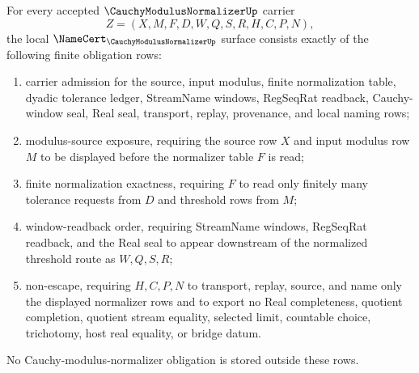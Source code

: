\begin{theorem}
\label{thm:cauchy-modulus-normalizer-namecert-obligations}
For every accepted $\CauchyModulusNormalizerUp$ carrier
$$
Z=(X,M,F,D,W,Q,S,R,H,C,P,N),
$$
the local $\NameCert_{\CauchyModulusNormalizerUp}$ surface consists exactly of the following finite obligation rows:
\begin{enumerate}
\item carrier admission for the source, input modulus, finite normalization table, dyadic tolerance ledger, StreamName windows, RegSeqRat readback, Cauchy-window seal, Real seal, transport, replay, provenance, and local naming rows;
\item modulus-source exposure, requiring the source row $X$ and input modulus row $M$ to be displayed before the normalizer table $F$ is read;
\item finite normalization exactness, requiring $F$ to read only finitely many tolerance requests from $D$ and threshold rows from $M$;
\item window-readback order, requiring StreamName windows, RegSeqRat readback, and the Real seal to appear downstream of the normalized threshold route as $W,Q,S,R$;
\item non-escape, requiring $H,C,P,N$ to transport, replay, source, and name only the displayed normalizer rows and to export no Real completeness, quotient completion, quotient stream equality, selected limit, countable choice, trichotomy, host real equality, or bridge datum.
\end{enumerate}
No Cauchy-modulus-normalizer obligation is stored outside these rows.
\end{theorem}
